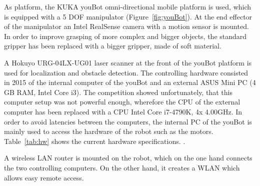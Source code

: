 As platform, the KUKA youBot omni-directional mobile platform is used, which is equipped with a 5 DOF manipulator (Figure~\ref{fig:youBot}). At the end effector of the manipulator an Intel RealSense camera with a motion sensor is mounted. In order to improve grasping of more complex and bigger objects, the standard gripper has been replaced with a bigger gripper, made of soft material.   

A Hokuyo URG-04LX-UG01 laser scanner at the front of the youBot platform is used for localization and obstacle detection. 
The controlling hardware consisted in 2015 of the internal computer of the youBot and an external ASUS Mini PC (4 GB RAM, Intel Core i3). The competition showed unfortunately, that this computer setup was not powerful enough, wherefore the CPU of the external computer has been replaced with a CPU Intel Core i7-4790K, 4x 4.00GHz. In order to avoid latencies between the computers, the internal PC of the youBot is mainly used to access the hardware of the robot such as the motors. Table~\ref{tab:hw} shows the current hardware specifications. . 



A wireless LAN router is mounted on the robot, which on the one hand connects the two controlling computers. On the other hand, it creates a WLAN which allows easy remote access.


